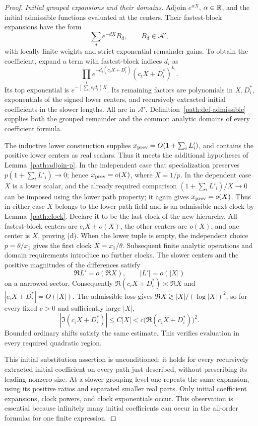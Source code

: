 \begin{proof}
\emph{Initial grouped expansions and their domains.}
Adjoin \(e^{\alpha X}\), \(\alpha\in\mathbb{R}\), and the initial
admissible functions evaluated at the centers.  Their fastest-block
expansions have the form
\begin{equation}\label{path:eq-grouped}
 \sum_d e^{-dX}B_d,\qquad B_d\in\mathcal A',
\end{equation}
with locally finite weights and strict exponential remainder gains.
To obtain the coefficient, expand a term with fastest-block indices
\(d_i\) as
\[
 \prod_i e^{-d_i(c_iX+D_i^*)}(c_iX+D_i^*)^{k_i}.
\]
Its top exponential is \(e^{-(\sum_i c_id_i)X}\).  Its remaining
factors are polynomials in \(X,D_i^*\), exponentials of the signed
lower centers, and recursively extracted initial coefficients in the
slower lengths.  All are in \(\mathcal A'\).  Definition~\ref{path:def-admissible}
supplies both the grouped remainder and the common analytic domains
of every coefficient formula.

The inductive lower construction supplies
\(x_{\rm prev}=O(1+\sum_iL'_i)\), and contains the positive lower
centers as real scalars.  Thus it meets the additional hypotheses of
Lemma~\ref{path:adjoin-p}.  In the independent case that specialization
preserves \(p(1+\sum_iL'_i)\to0\); hence
\(x_{\rm prev}=o(X)\), where \(X=1/p\).  In the dependent case
\(X\) is a lower scalar, and the already required comparison
\((1+\sum_iL'_i)/X\to0\) can be imposed using the lower path
property; it again gives \(x_{\rm prev}=o(X)\).  Thus in either
case \(X\) belongs to the lower path field and is an admissible
next clock by Lemma~\ref{path:clock}.  Declare it to be the last
clock of the new hierarchy.  All fastest-block centers are
\(c_iX+o(X)\), the other centers are \(o(X)\), and one center
is \(X\), proving \textup{(d)}.  When the lower tuple is empty,
the independent choice \(p=\theta/x_1\) gives the first clock
\(X=x_1/\theta\).  Subsequent finite analytic operations and domain
requirements introduce no further clocks.
The slower centers and the positive magnitudes of the differences
satisfy
\[
 \Re L'=o(\Re X),\qquad |L'|=o(|X|)
\]
on a narrowed sector.  Consequently
\(\Re(c_iX+D_i^*)\asymp\Re X\) and
\(|c_iX+D_i^*|=O(|X|)\).  The admissible loss gives
\(\Re X\gtrsim |X|/(\log|X|)^2\), so for every fixed \(c>0\)
and sufficiently large \(|X|\),
\[
 |\Im(c_iX+D_i^*)|
 \le C|X|<c\bigl(\Re(c_iX+D_i^*)\bigr)^2.
\]
Bounded ordinary shifts satisfy the same estimate.  This verifies
evaluation in every required quadratic region.

This initial substitution assertion is unconditioned: it holds for
every recursively extracted initial coefficient on every path just
described, without prescribing its leading nonzero size.  At a slower
grouping level one repeats the same expansion, using its positive
ratios and separated smaller real parts.  Only initial coefficient
expansions, clock powers, and clock exponentials occur.  This observation
is essential because infinitely many initial coefficients can occur
in the all-order formulas for one finite expression.


\end{proof}
